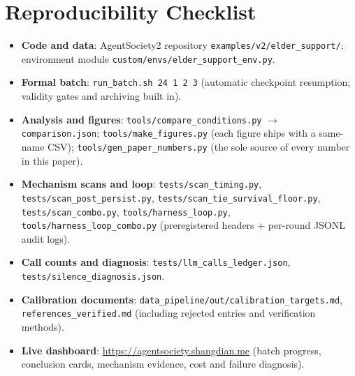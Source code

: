 \documentclass[10pt,twocolumn]{article}
\begin{document}
\section{Reproducibility Checklist}\label{app:repro}
\begin{itemize}
  \raggedright %
  \item \textbf{Code and data}: AgentSociety2 repository \texttt{examples/v2/elder\_support/}; environment module \texttt{custom/envs/elder\_support\_env.py}.
  \item \textbf{Formal batch}: \texttt{run\_batch.sh 24 1 2 3} (automatic checkpoint resumption; validity gates and archiving built in).
  \item \textbf{Analysis and figures}: \texttt{tools/compare\_conditions.py} $\rightarrow$ \texttt{comparison.json}; \texttt{tools/make\_figures.py} (each figure ships with a same-name CSV); \texttt{tools/gen\_paper\_numbers.py} (the sole source of every number in this paper).
  \item \textbf{Mechanism scans and loop}: \texttt{tests/scan\_timing.py}, \texttt{tests/scan\_post\_persist.py}, \texttt{tests/scan\_tie\_survival\_floor.py}, \texttt{tests/scan\_combo.py}, \texttt{tools/harness\_loop.py}, \texttt{tools/harness\_loop\_combo.py} (preregistered headers + per-round JSONL audit logs).
  \item \textbf{Call counts and diagnosis}: \texttt{tests/llm\_calls\_ledger.json}, \texttt{tests/silence\_diagnosis.json}.
  \item \textbf{Calibration documents}: \texttt{data\_pipeline/out/calibration\_targets.md}, \texttt{references\_verified.md} (including rejected entries and verification methods).
  \item \textbf{Live dashboard}: \url{https://agentsociety.shangdian.me} (batch progress, conclusion cards, mechanism evidence, cost and failure diagnosis).
\end{itemize}
\end{document}
